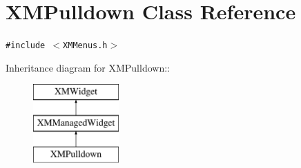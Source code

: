 \section{XMPulldown  Class Reference}
\label{classXMPulldown}
{\tt \#include $<$XMMenus.h$>$}

Inheritance diagram for XMPulldown::\begin{figure}[H]
\begin{center}
\leavevmode
\includegraphics[height=3cm]{classXMPulldown}
\end{center}
\end{figure}
